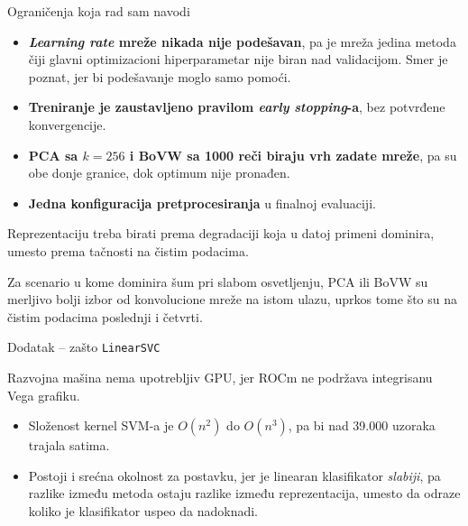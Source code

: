 \documentclass[aspectratio=169, 10pt]{beamer}
\begin{document}
\begin{frame}{Ograničenja koja rad sam navodi}

\begin{itemize}
  \item \textbf{\textit{Learning rate} mreže nikada nije podešavan}, pa je mreža jedina
        metoda čiji glavni optimizacioni hiperparametar nije biran nad validacijom. Smer je
        poznat, jer bi podešavanje moglo samo pomoći.
  \item \textbf{Treniranje je zaustavljeno pravilom \textit{early stopping}-a}, bez potvrđene
        konvergencije.
  \item \textbf{PCA sa $k=256$ i BoVW sa 1000 reči biraju vrh zadate mreže}, pa su obe
        donje granice, dok optimum nije pronađen.
  \item \textbf{Jedna konfiguracija pretprocesiranja} u finalnoj evaluaciji.
\end{itemize}

\end{frame}

\begin{frame}[standout]

Reprezentaciju treba birati prema degradaciji koja u datoj primeni dominira,
umesto prema tačnosti na čistim podacima.

\vspace{0.6cm}
\small
Za scenario u kome dominira šum pri slabom osvetljenju, PCA ili BoVW su merljivo bolji izbor
od konvolucione mreže na istom ulazu, uprkos tome što su na čistim podacima poslednji i
četvrti.

\end{frame}

\appendix

\begin{frame}{Dodatak -- zašto \texttt{LinearSVC}}

Razvojna mašina nema upotrebljiv GPU, jer ROCm ne podržava integrisanu Vega grafiku.

\begin{itemize}
  \item Složenost kernel SVM-a je $O(n^2)$ do $O(n^3)$, pa bi nad 39.000 uzoraka trajala
        satima.
  \item Postoji i srećna okolnost za postavku, jer je linearan klasifikator \emph{slabiji},
        pa razlike između metoda ostaju razlike između reprezentacija, umesto da odraze
        koliko je klasifikator uspeo da nadoknadi.
\end{itemize}

\end{frame}
\end{document}
